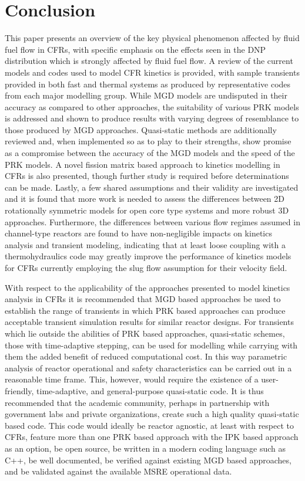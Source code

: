 \documentclass[review]{elsarticle}
\begin{document}
\section{Conclusion} \label{sec:conc}
This paper presents an overview of the key physical phenomenon affected
 by fluid fuel
flow in CFRs, with specific emphasis on the effects seen
in the DNP distribution which is strongly affected by fluid fuel flow.
A review of the current models and codes used to
model CFR kinetics is provided, with sample transients provided in both
fast and thermal systems as produced by representative codes from each major
modelling group. While MGD models are undisputed in their accuracy as compared
to other approaches, the suitability of various PRK models is addressed
and shown to produce results with varying degrees of resemblance to
those produced by MGD approaches. Quasi-static methods are additionally 
reviewed and, when implemented so as to play to their strengths, show promise
as a compromise between the accuracy of the MGD models and the speed of the PRK
models. A novel fission matrix based approach to kinetics modelling in CFRs is
also presented, though further study is required before determinations can be
made. Lastly, a few shared assumptions and their validity are investigated and
it is found that more work is needed to assess the differences between 2D 
rotationally symmetric models for open core type systems and more robust 3D
approaches. Furthermore, the differences between various flow regimes assumed
in channel-type reactors are found to have non-negligible impacts on kinetics
analysis and transient modeling, indicating that at least loose coupling with
a thermohydraulics code may greatly improve the performance of kinetics models
for CFRs currently employing the slug flow assumption for their velocity field.
\par With respect to the applicability of the approaches presented to model
kinetics analysis in CFRs it is recommended that MGD based approaches be used
to establish the range of transients in which PRK based approaches can produce
acceptable transient simulation results for similar reactor designs.
For transients which lie outside the
abilities of PRK based approaches, quasi-static schemes, those with time-adaptive
stepping, can be used for modelling while carrying with them the added benefit
of reduced computational cost. In this way parametric analysis of reactor operational
and safety characteristics can be carried out in a reasonable time frame.
This, however, would require the existence of a
user-friendly, time-adaptive, and general-purpose quasi-static code. It is 
thus recommended that the academic community, perhaps in partnership with
government labs and private organizations, create such a high quality quasi-static
based code. This code would ideally be reactor agnostic, at least with respect to
CFRs, feature more than one PRK based approach with the IPK based approach as an
option, be open source, be written in a modern coding language such as C++, 
be well documented, be verified against existing MGD based approaches, and
be validated against the available MSRE operational data.
\end{document}
